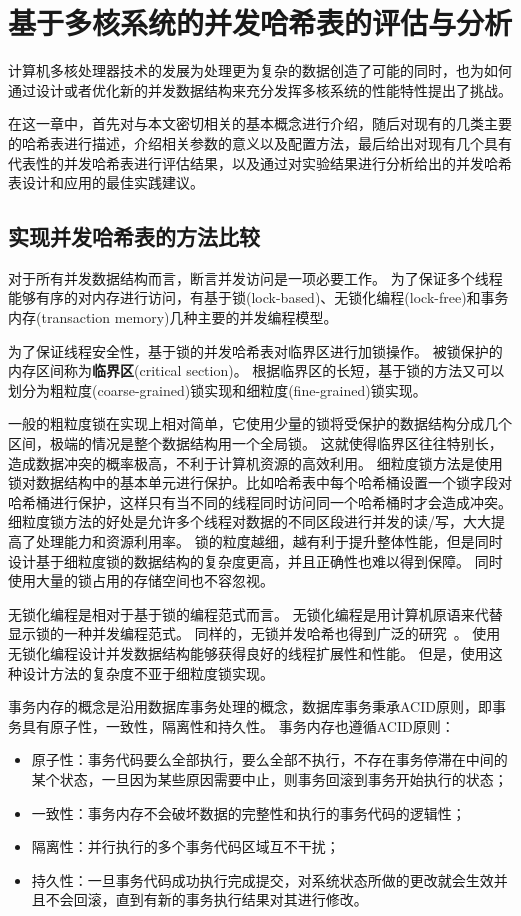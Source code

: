 \chapter{基于多核系统的并发哈希表的评估与分析}
\label{chap:chts}

计算机多核处理器技术的发展为处理更为复杂的数据创造了可能的同时，也为如何通过设计或者优化新的并发数据结构来充分发挥多核系统的性能特性提出了挑战。

在这一章中，首先对与本文密切相关的基本概念进行介绍，随后对现有的几类主要的哈希表进行描述，介绍相关参数的意义以及配置方法，最后给出对现有几个具有代表性的并发哈希表进行评估结果，以及通过对实验结果进行分析给出的并发哈希表设计和应用的最佳实践建议。

\section{实现并发哈希表的方法比较}

对于所有并发数据结构而言，断言并发访问是一项必要工作。
为了保证多个线程能够有序的对内存进行访问，有基于锁(lock-based)、无锁化编程(lock-free)和事务内存(transaction memory)几种主要的并发编程模型。

为了保证线程安全性，基于锁的并发哈希表对临界区进行加锁操作。
被锁保护的内存区间称为\textbf{临界区}(critical section)。
根据临界区的长短，基于锁的方法又可以划分为粗粒度(coarse-grained)锁实现和细粒度(fine-grained)锁实现。

一般的粗粒度锁在实现上相对简单，它使用少量的锁将受保护的数据结构分成几个区间，极端的情况是整个数据结构用一个全局锁。
这就使得临界区往往特别长，造成数据冲突的概率极高，不利于计算机资源的高效利用。
细粒度锁方法是使用锁对数据结构中的基本单元进行保护。比如哈希表中每个哈希桶设置一个锁字段对哈希桶进行保护，这样只有当不同的线程同时访问同一个哈希桶时才会造成冲突。
细粒度锁方法的好处是允许多个线程对数据的不同区段进行并发的读/写，大大提高了处理能力和资源利用率。
锁的粒度越细，越有利于提升整体性能，但是同时设计基于细粒度锁的数据结构的复杂度更高，并且正确性也难以得到保障。
同时使用大量的锁占用的存储空间也不容忽视。

无锁化编程是相对于基于锁的编程范式而言。
无锁化编程是用计算机原语来代替显示锁的一种并发编程范式。
同样的，无锁并发哈希也得到广泛的研究~\cite{urcu, nonblocking,metreveli2012cphash}。
使用无锁化编程设计并发数据结构能够获得良好的线程扩展性和性能。
但是，使用这种设计方法的复杂度不亚于细粒度锁实现。

事务内存的概念是沿用数据库事务处理的概念，数据库事务秉承ACID原则，即事务具有原子性，一致性，隔离性和持久性。
事务内存也遵循ACID原则：
\begin{itemize}
  \item 原子性：事务代码要么全部执行，要么全部不执行，不存在事务停滞在中间的某个状态，一旦因为某些原因需要中止，则事务回滚到事务开始执行的状态；
  \item 一致性：事务内存不会破坏数据的完整性和执行的事务代码的逻辑性；
  \item 隔离性：并行执行的多个事务代码区域互不干扰；
  \item 持久性：一旦事务代码成功执行完成提交，对系统状态所做的更改就会生效并且不会回滚，直到有新的事务执行结果对其进行修改。
\end{itemize}

